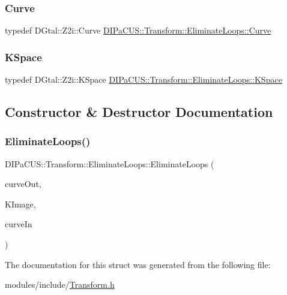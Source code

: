 \subsubsection{\texorpdfstring{Curve}{Curve}}
{\footnotesize\ttfamily typedef D\+Gtal\+::\+Z2i\+::\+Curve \mbox{\hyperlink{structDIPaCUS_1_1Transform_1_1EliminateLoops_a61f2dc2fd24bfb776edbd6358e128e03}{D\+I\+Pa\+C\+U\+S\+::\+Transform\+::\+Eliminate\+Loops\+::\+Curve}}}

\mbox{\label{structDIPaCUS_1_1Transform_1_1EliminateLoops_aed679a455575ffdf2c1e5140fdb451fe}} 
\subsubsection{\texorpdfstring{K\+Space}{KSpace}}
{\footnotesize\ttfamily typedef D\+Gtal\+::\+Z2i\+::\+K\+Space \mbox{\hyperlink{structDIPaCUS_1_1Transform_1_1EliminateLoops_aed679a455575ffdf2c1e5140fdb451fe}{D\+I\+Pa\+C\+U\+S\+::\+Transform\+::\+Eliminate\+Loops\+::\+K\+Space}}}



\subsection{Constructor \& Destructor Documentation}
\mbox{\label{structDIPaCUS_1_1Transform_1_1EliminateLoops_a5054417882a5fb8867d237ca11eb5867}} 
\subsubsection{\texorpdfstring{Eliminate\+Loops()}{EliminateLoops()}}
{\footnotesize\ttfamily D\+I\+Pa\+C\+U\+S\+::\+Transform\+::\+Eliminate\+Loops\+::\+Eliminate\+Loops (\begin{DoxyParamCaption}\item[{\mbox{\hyperlink{structDIPaCUS_1_1Transform_1_1EliminateLoops_a61f2dc2fd24bfb776edbd6358e128e03}{Curve}} \&}]{curve\+Out,  }\item[{\mbox{\hyperlink{structDIPaCUS_1_1Transform_1_1EliminateLoops_aed679a455575ffdf2c1e5140fdb451fe}{K\+Space}} \&}]{K\+Image,  }\item[{\mbox{\hyperlink{structDIPaCUS_1_1Transform_1_1EliminateLoops_a61f2dc2fd24bfb776edbd6358e128e03}{Curve}} \&}]{curve\+In }\end{DoxyParamCaption})\hspace{0.3cm}{\ttfamily [inline]}}



The documentation for this struct was generated from the following file\+:\begin{DoxyCompactItemize}
\item 
modules/include/\mbox{\hyperlink{Transform_8h}{Transform.\+h}}\end{DoxyCompactItemize}
